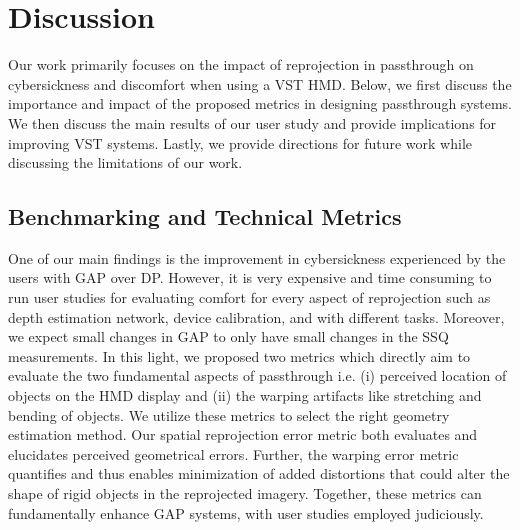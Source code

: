 \section{Discussion}
Our work primarily focuses on the impact of reprojection in passthrough on cybersickness and discomfort when using a VST HMD. Below, we first discuss the importance and impact of the proposed metrics in designing passthrough systems. We then discuss the main results of our user study and provide implications for improving VST systems. Lastly, we provide directions for future work while discussing the limitations of our work.

\subsection{Benchmarking and Technical Metrics}

One of our main findings is the improvement in cybersickness experienced by the users with GAP over DP. However, it is very expensive and time consuming to run user studies for evaluating comfort for every aspect of reprojection such as depth estimation network, device calibration, and with different tasks. Moreover, we expect small changes in GAP to only have small changes in the SSQ measurements. In this light, we proposed two metrics which directly aim to evaluate the two fundamental aspects of passthrough i.e. (i) perceived location of objects on the HMD display and (ii) the warping artifacts like stretching and bending of objects. We utilize these metrics to select the right geometry estimation method. 
Our spatial reprojection error metric both evaluates and elucidates perceived geometrical errors. Further, the warping error metric quantifies and thus enables minimization of added distortions that could alter the shape of rigid objects in the reprojected imagery. Together, these metrics can fundamentally enhance GAP systems, with user studies employed judiciously.

